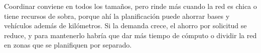  Coordinar conviene en todos los tamaños, pero rinde más cuando la red es chica o tiene recursos de sobra, porque ahí la planificación puede ahorrar bases y vehículos además de kilómetros. Si la demanda crece, el ahorro por solicitud se reduce, y para mantenerlo habría que dar más tiempo de cómputo o dividir la red en zonas que se planifiquen por separado.

